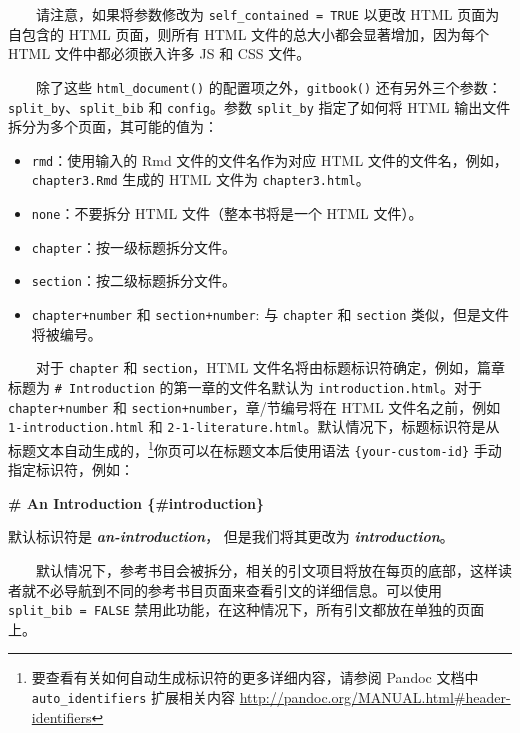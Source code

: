 \documentclass[
  12pt,
]{krantz}
\newenvironment{Shaded}{\begin{snugshade}}{\end{snugshade}}
\newcommand{\FunctionTok}[1]{\textcolor[rgb]{0.13,0.29,0.53}{\textbf{#1}}}
\newcommand{\InformationTok}[1]{\textcolor[rgb]{0.56,0.35,0.01}{\textbf{\textit{#1}}}}
\newcommand{\NormalTok}[1]{#1}
\providecommand{\tightlist}{%
  \setlength{\itemsep}{0pt}\setlength{\parskip}{0pt}}
\theoremstyle{definition}
\theoremstyle{definition}
\theoremstyle{definition}
\theoremstyle{definition}
\theoremstyle{remark}
\begin{document}
  请注意，如果将参数修改为 \texttt{self\_contained\ =\ TRUE} 以更改 HTML 页面为自包含的 HTML 页面，则所有 HTML 文件的总大小都会显著增加，因为每个 HTML 文件中都必须嵌入许多 JS 和 CSS 文件。

  除了这些 \texttt{html\_document()} 的配置项之外，\texttt{gitbook()} 还有另外三个参数：\texttt{split\_by}、\texttt{split\_bib} 和 \texttt{config}。参数 \texttt{split\_by} 指定了如何将 HTML 输出文件拆分为多个页面，其可能的值为：

\begin{itemize}
\tightlist
\item
  \texttt{rmd}：使用输入的 Rmd 文件的文件名作为对应 HTML 文件的文件名，例如，\texttt{chapter3.Rmd} 生成的 HTML 文件为 \texttt{chapter3.html}。
\item
  \texttt{none}：不要拆分 HTML 文件（整本书将是一个 HTML 文件）。
\item
  \texttt{chapter}：按一级标题拆分文件。
\item
  \texttt{section}：按二级标题拆分文件。
\item
  \texttt{chapter+number} 和 \texttt{section+number}: 与 \texttt{chapter} 和 \texttt{section} 类似，但是文件将被编号。
\end{itemize}

  对于 \texttt{chapter} 和 \texttt{section}，HTML 文件名将由标题标识符确定，例如，篇章标题为 \texttt{\#\ Introduction} 的第一章的文件名默认为 \texttt{introduction.html}。对于 \texttt{chapter+number} 和 \texttt{section+number}，章/节编号将在 HTML 文件名之前，例如 \texttt{1-introduction.html} 和 \texttt{2-1-literature.html}。默认情况下，标题标识符是从标题文本自动生成的，\footnote{要查看有关如何自动生成标识符的更多详细内容，请参阅 Pandoc 文档中 \texttt{auto\_identifiers} 扩展相关内容 \url{http://pandoc.org/MANUAL.html\#header-identifiers}}你页可以在标题文本后使用语法 \texttt{\{your-custom-id\}} 手动指定标识符，例如：

\begin{Shaded}
\begin{Highlighting}[]
\FunctionTok{\# An Introduction \{\#introduction\}}

\NormalTok{默认标识符是 }\InformationTok{\textasciigrave{}an{-}introduction\textasciigrave{}}\NormalTok{，}
\NormalTok{但是我们将其更改为 }\InformationTok{\textasciigrave{}introduction\textasciigrave{}}\NormalTok{。}
\end{Highlighting}
\end{Shaded}

  默认情况下，参考书目会被拆分，相关的引文项目将放在每页的底部，这样读者就不必导航到不同的参考书目页面来查看引文的详细信息。可以使用 \texttt{split\_bib\ =\ FALSE} 禁用此功能，在这种情况下，所有引文都放在单独的页面上。
\end{document}
